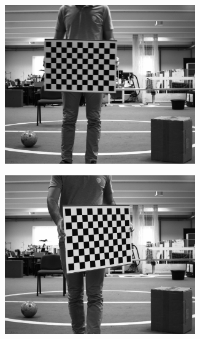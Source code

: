 \begin{figure}[!ht]
	\centering
	\begin{subfigure}[c]{0.30\textwidth}
		\includegraphics[width=0.9\textwidth]{img/camera-calibration/left-0001.png}
	\end{subfigure}
	\begin{subfigure}[c]{0.30\textwidth}
		\includegraphics[width=0.9\textwidth]{img/camera-calibration/left-0005.png}
	\end{subfigure}
	\begin{subfigure}[c]{0.30\textwidth}

\end{subfigure}
\end{figure}
